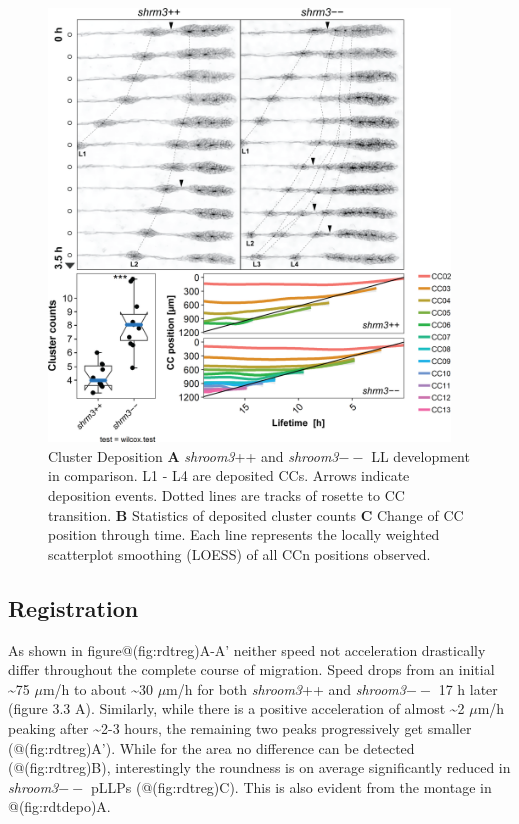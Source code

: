 \documentclass[11pt,singlespacinge,twoside]{reedthesis} %
\begin{document}
\begin{figure}

{\centering \includegraphics[width=0.95\textwidth]{figures/results/03_rosettes/tracking-01} 

}

\caption[Cluster Deposition]{Cluster Deposition \textbf{A} \emph{shroom3}++ and \emph{shroom3}\(--\) LL development in comparison. L1 - L4 are deposited CCs. Arrows indicate deposition events. Dotted lines are tracks of rosette to CC transition. \textbf{B} Statistics of deposited cluster counts \textbf{C} Change of CC position through time. Each line represents the locally weighted scatterplot smoothing (LOESS) of all CCn positions observed.}\label{fig:rdtdepo}
\end{figure}
\hypertarget{registration-1}{%
\subsection{Registration}\label{registration-1}}

As shown in figure@(fig:rdtreg)A-A' neither speed not acceleration drastically differ throughout the complete course of migration. Speed drops from an initial \textasciitilde{}75 \(\mu\)m/h to about \textasciitilde{}30 \(\mu\)m/h for both \emph{shroom3}++ and \emph{shroom3}\(--\) 17 h later (figure 3.3 A). Similarly, while there is a positive acceleration of almost \textasciitilde{}2 \(\mu\)m/h peaking after \textasciitilde{}2-3 hours, the remaining two peaks progressively get smaller (@(fig:rdtreg)A').
While for the area no difference can be detected (@(fig:rdtreg)B), interestingly the roundness is on average significantly reduced in \emph{shroom3}\(--\) pLLPs (@(fig:rdtreg)C). This is also evident from the montage in @(fig:rdtdepo)A.
\end{document}
